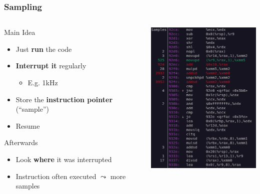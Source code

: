 \documentclass[xcolor={x11names,svgnames}]{beamer}
\begin{document}
\begin{frame}
  \frametitle{Sampling}

  \begin{columns}
    \begin{column}{5cm}
  \begin{block}{Main Idea}
    \begin{itemize}
    \item Just \textbf{run} the code
    \item \textbf{Interrupt it} regularly
      \begin{itemize}
      \item E.g. 1kHz
      \end{itemize}
    \item Store the \textbf{instruction pointer} (``sample'')
    \item Resume
    \end{itemize}    
  \end{block}

  \begin{exampleblock}{Afterwards}
    \begin{itemize}
    \item Look \textbf{where} it was interrupted
    \item Instruction often executed $\leadsto$ more samples
    \end{itemize}
  \end{exampleblock}
  
\end{column}
\begin{column}{6cm}
  \includegraphics[width=6cm]{perf.png}
\end{column}
\end{columns}
\end{frame}
\end{document}
